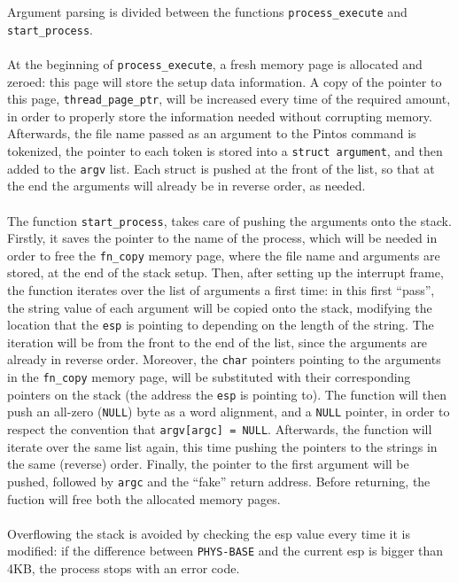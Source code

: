 \documentclass[a4wide, 11pt]{article}
\newcommand{\tx}{\texttt}
\begin{document}
Argument parsing is divided between the functions \tx{process\_execute} and \tx{start\_process}. \\\\
At the beginning of \tx{process\_execute}, a fresh memory page is allocated and zeroed: this page will store the setup data information. A copy of the pointer to this page, \tx{thread\_page\_ptr}, will be increased every time of the required amount, in order to properly store the information needed without corrupting memory. Afterwards, the file name passed as an argument to the Pintos command is tokenized, the pointer to each token is stored into a \tx{struct argument}, and then added to the \tx{argv} list. Each struct is pushed at the front of the list, so that at the end the arguments will already be in reverse order, as needed. \\\\
The function \tx{start\_process}, takes care of pushing the arguments onto the stack. Firstly, it saves the pointer to the name of the process, which will be needed in order to free the \tx{fn\_copy} memory page, where the file name and arguments are stored, at the end of the stack setup. Then, after setting up the interrupt frame, the function iterates over the list of arguments a first time: in this first ``pass'', the string value of each argument will be copied onto the stack, modifying the location that the \tx{esp} is pointing to depending on the length of the string. The iteration will be from the front to the end of the list, since the arguments are already in reverse order. Moreover, the \tx{char} pointers pointing to the arguments in the \tx{fn\_copy} memory page, will be substituted with their corresponding pointers on the stack (the address the \tx{esp} is pointing to). The function will then push an all-zero (\tx{NULL}) byte as a word alignment, and a \tx{NULL} pointer, in order to respect the convention that \tx{argv[argc] = NULL}. Afterwards, the function will iterate over the same list again, this time pushing the pointers to the strings in the same (reverse) order. Finally, the pointer to the first argument will be pushed, followed by \tx{argc} and the ``fake'' return address. Before returning, the fuction will free both the allocated memory pages. \\\\
Overflowing the stack is avoided by checking the esp value every time it is modified: if the difference between \tx{PHYS-BASE} and the current esp is bigger than 4KB, the process stops with an error code.
\end{document}
